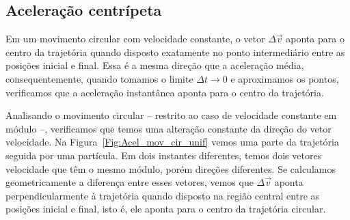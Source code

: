 \subsection{Aceleração centrípeta}


\begin{marginfigure}
\centering
   \caption{Em um movimento circular com velocidade constante, o vetor $\Delta\vec{v}$ aponta para o centro da trajetória quando disposto exatamente no ponto intermediário entre as posições inicial e final. Essa é a mesma direção que a aceleração média, consequentemente, quando tomamos o limite $\Delta t \to 0$ e aproximamos os pontos, verificamos que a aceleração instantânea aponta para o centro da trajetória.\label{Fig:Acel_mov_cir_unif}}
\end{marginfigure}

Analisando o movimento circular -- restrito ao caso de velocidade constante em módulo --, verificamos que temos uma alteração constante da direção do vetor velocidade. Na Figura~\ref{Fig:Acel_mov_cir_unif} vemos uma parte da trajetória seguida por uma partícula. Em dois instantes diferentes, temos dois vetores velocidade que têm o mesmo módulo, porém direções diferentes. Se calculamos geometricamente a diferença entre esses vetores, vemos que $\Delta \vec{v}$ aponta perpendicularmente à trajetória quando disposto na região central entre as posições inicial e final, isto é, ele aponta para o centro da trajetória circular.

